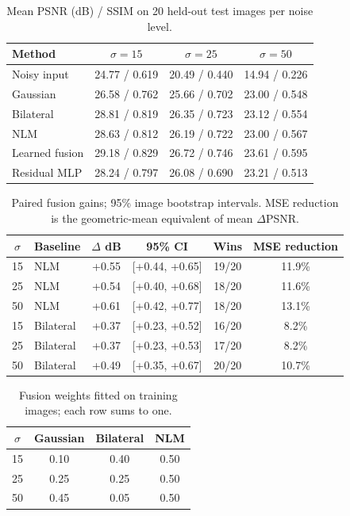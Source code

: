 \begin{table}[ht]
\centering\small
\caption{Mean PSNR (dB) / SSIM on 20 held-out test images per noise level.}
\label{tab:main}
\begin{tabular}{lccc}
\toprule
Method & $\sigma=15$ & $\sigma=25$ & $\sigma=50$ \\
\midrule
Noisy input & 24.77 / 0.619 & 20.49 / 0.440 & 14.94 / 0.226 \\
Gaussian & 26.58 / 0.762 & 25.66 / 0.702 & 23.00 / 0.548 \\
Bilateral & 28.81 / 0.819 & 26.35 / 0.723 & 23.12 / 0.554 \\
NLM & 28.63 / 0.812 & 26.19 / 0.722 & 23.00 / 0.567 \\
Learned fusion & 29.18 / 0.829 & 26.72 / 0.746 & 23.61 / 0.595 \\
Residual MLP & 28.24 / 0.797 & 26.08 / 0.690 & 23.21 / 0.513 \\
\bottomrule
\end{tabular}
\end{table}

\begin{table}[ht]
\centering\small
\caption{Paired fusion gains; 95\% image bootstrap intervals. MSE reduction is the geometric-mean equivalent of mean $\Delta$PSNR.}
\label{tab:paired}
\begin{tabular}{c l c c c c}
\toprule
$\sigma$ & Baseline & $\Delta$ dB & 95\% CI & Wins & MSE reduction \\
\midrule
15 & NLM & +0.55 & [+0.44, +0.65] & 19/20 & 11.9\% \\
25 & NLM & +0.54 & [+0.40, +0.68] & 18/20 & 11.6\% \\
50 & NLM & +0.61 & [+0.42, +0.77] & 18/20 & 13.1\% \\
15 & Bilateral & +0.37 & [+0.23, +0.52] & 16/20 & 8.2\% \\
25 & Bilateral & +0.37 & [+0.23, +0.53] & 17/20 & 8.2\% \\
50 & Bilateral & +0.49 & [+0.35, +0.67] & 20/20 & 10.7\% \\
\bottomrule
\end{tabular}
\end{table}

\begin{table}[ht]
\centering\small
\caption{Fusion weights fitted on training images; each row sums to one.}
\label{tab:weights}
\begin{tabular}{cccc}
\toprule
$\sigma$ & Gaussian & Bilateral & NLM \\
\midrule
15 & 0.10 & 0.40 & 0.50 \\
25 & 0.25 & 0.25 & 0.50 \\
50 & 0.45 & 0.05 & 0.50 \\
\bottomrule
\end{tabular}
\end{table}

